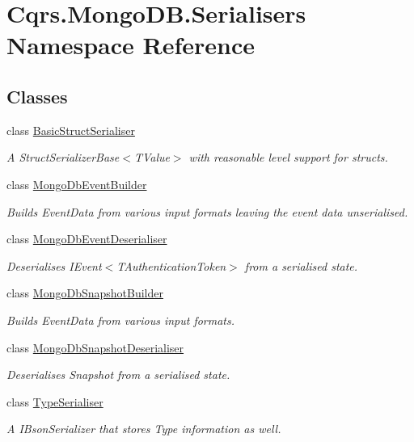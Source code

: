 \hypertarget{namespaceCqrs_1_1MongoDB_1_1Serialisers}{}\section{Cqrs.\+Mongo\+D\+B.\+Serialisers Namespace Reference}
\label{namespaceCqrs_1_1MongoDB_1_1Serialisers}
\subsection*{Classes}
\begin{DoxyCompactItemize}
\item 
class \hyperlink{classCqrs_1_1MongoDB_1_1Serialisers_1_1BasicStructSerialiser}{Basic\+Struct\+Serialiser}
\begin{DoxyCompactList}\small\item\em A Struct\+Serializer\+Base$<$\+T\+Value$>$ with reasonable level support for structs. \end{DoxyCompactList}\item 
class \hyperlink{classCqrs_1_1MongoDB_1_1Serialisers_1_1MongoDbEventBuilder}{Mongo\+Db\+Event\+Builder}
\begin{DoxyCompactList}\small\item\em Builds Event\+Data from various input formats leaving the event data unserialised. \end{DoxyCompactList}\item 
class \hyperlink{classCqrs_1_1MongoDB_1_1Serialisers_1_1MongoDbEventDeserialiser}{Mongo\+Db\+Event\+Deserialiser}
\begin{DoxyCompactList}\small\item\em Deserialises I\+Event$<$\+T\+Authentication\+Token$>$ from a serialised state. \end{DoxyCompactList}\item 
class \hyperlink{classCqrs_1_1MongoDB_1_1Serialisers_1_1MongoDbSnapshotBuilder}{Mongo\+Db\+Snapshot\+Builder}
\begin{DoxyCompactList}\small\item\em Builds Event\+Data from various input formats. \end{DoxyCompactList}\item 
class \hyperlink{classCqrs_1_1MongoDB_1_1Serialisers_1_1MongoDbSnapshotDeserialiser}{Mongo\+Db\+Snapshot\+Deserialiser}
\begin{DoxyCompactList}\small\item\em Deserialises Snapshot from a serialised state. \end{DoxyCompactList}\item 
class \hyperlink{classCqrs_1_1MongoDB_1_1Serialisers_1_1TypeSerialiser}{Type\+Serialiser}
\begin{DoxyCompactList}\small\item\em A I\+Bson\+Serializer that stores Type information as well. \end{DoxyCompactList}\end{DoxyCompactItemize}

